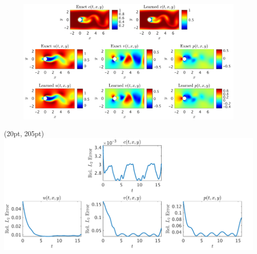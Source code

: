 \documentclass[xcolor=dvipsnames,hyperref={breaklinks=true},mathserif,professionalfont,dvipdfmx,12pt]{beamer}
\begin{document}
\begin{frame}[t]
  \begin{figure}[H]
    \centering
      \includegraphics[width=0.9\linewidth]{figure/fig5.png}
  \end{figure}
  \begin{textblock*}{0.5\linewidth}(20pt, 205pt)
    \includegraphics[width=\linewidth]{figure/fig6.png}
    \end{textblock*}
\end{frame}
\end{document}
